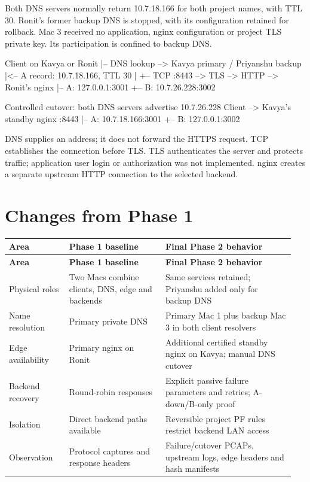\documentclass[12pt,a4paper]{article}
\newcommand{\tablehead}{\rowcolor{Pale}}
\begin{document}
Both DNS servers normally return 10.7.18.166 for both project names, with TTL 30. Ronit's former backup DNS is stopped, with its configuration retained for rollback. Mac 3 received no application, nginx configuration or project TLS private key. Its participation is confined to backup DNS.


\begin{codeblock}
Client on Kavya or Ronit
  |-- DNS lookup --> Kavya primary / Priyanshu backup
  |<-- A record: 10.7.18.166, TTL 30
  |
  +-- TCP :8443 --> TLS --> HTTP --> Ronit's nginx
                                     |-- A: 127.0.0.1:3001
                                     +-- B: 10.7.26.228:3002

Controlled cutover: both DNS servers advertise 10.7.26.228
Client --> Kavya's standby nginx :8443
            |-- A: 10.7.18.166:3001
            +-- B: 127.0.0.1:3002
\end{codeblock}


DNS supplies an address; it does not forward the HTTPS request. TCP establishes the connection before TLS. TLS authenticates the server and protects traffic; application user login or authorization was not implemented. nginx creates a separate upstream HTTP connection to the selected backend.


\section{Changes from Phase 1}


\begingroup\small
\begin{longtable}{@{}>{\raggedright\arraybackslash}p{0.2\linewidth}>{\raggedright\arraybackslash}p{0.32\linewidth}>{\raggedright\arraybackslash}p{0.43\linewidth}@{}}
\toprule
\tablehead \textbf{Area} & \textbf{Phase 1 baseline} & \textbf{Final Phase 2 behavior}\\\midrule
\endfirsthead
\toprule
\tablehead \textbf{Area} & \textbf{Phase 1 baseline} & \textbf{Final Phase 2 behavior}\\\midrule
\endhead
Physical roles & Two Macs combine clients, DNS, edge and backends & Same services retained; Priyanshu added only for backup DNS\\
Name resolution & Primary private DNS & Primary Mac 1 plus backup Mac 3 in both client resolvers\\
Edge availability & Primary nginx on Ronit & Additional certified standby nginx on Kavya; manual DNS cutover\\
Backend recovery & Round-robin responses & Explicit passive failure parameters and retries; A-down/B-only proof\\
Isolation & Direct backend paths available & Reversible project PF rules restrict backend LAN access\\
Observation & Protocol captures and response headers & Failure/cutover PCAPs, upstream logs, edge headers and hash manifests\\
\bottomrule
\end{longtable}
\endgroup
\end{document}
